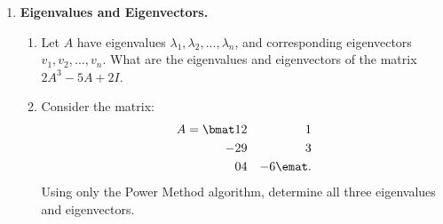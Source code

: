 \documentclass[12pt,twoside,openany]{memoir}
\begin{document}
\newpage
\vspace{25pt}
\begin{enumerate}[label = \arabic*.]
    \addtocounter{enumi}{4}
    \item \textbf{Eigenvalues and Eigenvectors.}
    \begin{enumerate}[label = (\alph*)]
        \item Let $A$ have eigenvalues $\lambda_1,\lambda_2,...,\lambda_n$, and corresponding eigenvectors $v_1,v_2,...,v_n$. What are the eigenvalues and eigenvectors of the matrix $2A^3 - 5A + 2I$.
        \item Consider the matrix:
        \begin{equation*}
        \begin{split}
            A = \bmat 1 & 2 & 1 \\ -2 & 9 & 3 \\ 0 & 4 & -6 \emat.
        \end{split}
        \end{equation*}
        Using only the Power Method algorithm, determine all three eigenvalues and eigenvectors.
    \end{enumerate}
\end{enumerate}
    
\end{document}
